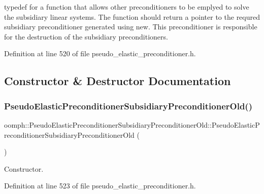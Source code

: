 typedef for a function that allows other preconditioners to be emplyed to solve the subsidiary linear systems. The function should return a pointer to the requred subsidiary preconditioner generated using new. This preconditioner is responsible for the destruction of the subsidiary preconditioners. 



Definition at line 520 of file pseudo\+\_\+elastic\+\_\+preconditioner.\+h.



\subsection{Constructor \& Destructor Documentation}
\mbox{\label{classoomph_1_1PseudoElasticPreconditionerSubsidiaryPreconditionerOld_a674640dd0de0b3a40857c01e8b868928}} 
\subsubsection{\texorpdfstring{Pseudo\+Elastic\+Preconditioner\+Subsidiary\+Preconditioner\+Old()}{PseudoElasticPreconditionerSubsidiaryPreconditionerOld()}\hspace{0.1cm}{\footnotesize\ttfamily [1/2]}}
{\footnotesize\ttfamily oomph\+::\+Pseudo\+Elastic\+Preconditioner\+Subsidiary\+Preconditioner\+Old\+::\+Pseudo\+Elastic\+Preconditioner\+Subsidiary\+Preconditioner\+Old (\begin{DoxyParamCaption}{ }\end{DoxyParamCaption})\hspace{0.3cm}{\ttfamily [inline]}}



Constructor. 



Definition at line 523 of file pseudo\+\_\+elastic\+\_\+preconditioner.\+h.

